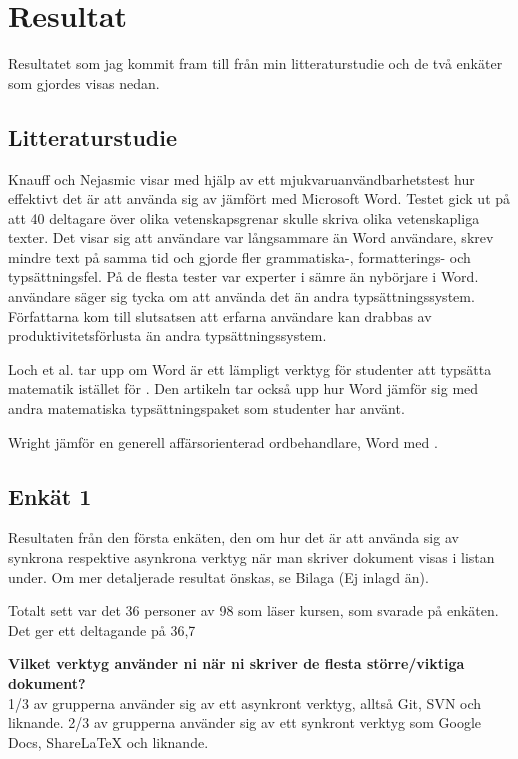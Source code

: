 \section{Resultat}
\label{sec:results-tuhkala}
Resultatet som jag kommit fram till från min litteraturstudie och de två enkäter som gjordes visas nedan.

\subsection{Litteraturstudie}
Knauff och Nejasmic \cite{knauff2014efficiency} visar med hjälp av ett mjukvaruanvändbarhetstest hur effektivt det är att använda sig av \latex jämfört med Microsoft Word. Testet gick ut på att 40 deltagare över olika vetenskapsgrenar skulle skriva olika vetenskapliga texter.
Det visar sig att \latex användare var långsammare än Word användare, skrev mindre text på samma tid och gjorde fler grammatiska-, formatterings- och typsättningsfel. På de flesta tester var experter i \latex sämre än nybörjare i Word. \latex användare säger sig tycka om att använda det än andra typsättningssystem. Författarna kom till slutsatsen att erfarna \latex användare kan drabbas av produktivitetsförlusta än andra typsättningssystem.

Loch et al. \cite{loch2014master} tar upp om Word är ett lämpligt verktyg för studenter att typsätta matematik istället för \latex. Den artikeln tar också upp hur Word jämför sig med andra matematiska typsättningspaket som studenter har använt. 

Wright \cite{wright2010technical} jämför en generell affärsorienterad ordbehandlare, Word med \latex.  


\subsection{Enkät 1}
Resultaten från den första enkäten, den om hur det är att använda sig av synkrona respektive asynkrona verktyg när man skriver dokument visas i listan under. Om mer detaljerade resultat önskas, se Bilaga (Ej inlagd än).

Totalt sett var det 36 personer av 98 som läser kursen, som svarade på enkäten. Det ger ett deltagande på 36,7%

\textbf{Vilket verktyg använder ni när ni skriver de flesta större/viktiga dokument?}
\\1/3 av grupperna använder sig av ett asynkront verktyg, alltså Git, SVN och liknande. 2/3 av grupperna använder sig av ett synkront verktyg som Google Docs, ShareLaTeX och liknande.

